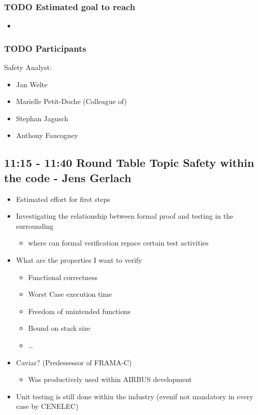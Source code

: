 \documentclass[a4paper,german]{article}
\begin{document}
\subsubsection{\textbf{TODO} Estimated goal to reach}
\label{sec-1-5-2}

\begin{itemize}
\item 
\end{itemize}
\subsubsection{\textbf{TODO} Participants}
\label{sec-1-5-3}

     Safety Analyst:
\begin{itemize}
\item Jan Welte
\item Marielle Petit-Doche (Colleague of)
\item Stephan Jagusch
\item Anthony Faucogney
\end{itemize}
\subsection{11:15 - 11:40 Round Table Topic Safety within the code - Jens Gerlach}
\label{sec-1-6}

\begin{itemize}
\item Estimated effort for first steps
\item Investigating the relationship between formal proof and testing in the surrounding
\begin{itemize}
\item where can formal verification repace certain test activities
\end{itemize}
\item What are the properties I want to verify
\begin{itemize}
\item Functional correctness
\item Worst Case execution time
\item Freedom of unintended functions
\item Bound on stack size
\item \ldots{}
\end{itemize}
\item Caviar? (Predessessor of FRAMA-C)
\begin{itemize}
\item Was productively used within AIRBUS development
\end{itemize}
\item Unit testing is still done within the industry (evenif not mandatory in every case by CENELEC)
\end{itemize}
\end{document}

